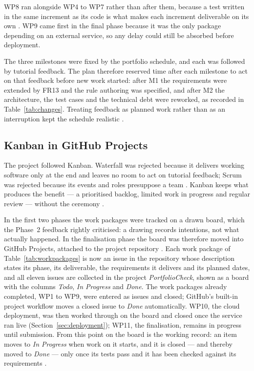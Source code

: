 \documentclass[a4paper,11pt]{article}
\begin{document}
WP8 ran alongside WP4 to WP7 rather than after them, because a test written in
the same increment as its code is what makes each increment deliverable on its
own \citep{Khorikov2020}. WP9 came first in the final phase because it was the
only package depending on an external service, so any delay could still be
absorbed before deployment.

The three milestones were fixed by the portfolio schedule, and each was followed
by tutorial feedback. The plan therefore reserved time after each milestone to
act on that feedback before new work started: after M1 the requirements were
extended by FR13 and the rule authoring was specified, and after M2 the
architecture, the test cases and the technical debt were reworked, as recorded in
Table~\ref{tab:changes}. Treating feedback as planned work rather than as an
interruption kept the schedule realistic \citep{Ambler2022}.

\subsection{Kanban in GitHub Projects}\label{sec:kanban}

The project followed Kanban. Waterfall was rejected because it delivers working
software only at the end and leaves no room to act on tutorial feedback; Scrum
was rejected because its events and roles presuppose a team
\citep{Schwaber2020}. Kanban keeps what produces the benefit --- a prioritised
backlog, limited work in progress and regular review --- without the ceremony
\citep{Ambler2022}.

In the first two phases the work packages were tracked on a drawn board, which
the Phase~2 feedback rightly criticised: a drawing records intentions, not what
actually happened. In the finalisation phase the board was therefore moved into
GitHub Projects, attached to the project repository \citep{GitHubProjects2025}.
Each work package of Table~\ref{tab:workpackages} is now an issue in the
repository whose description states its phase, its deliverable, the requirements
it delivers and its planned dates, and all eleven issues are collected in the
project \textit{PortfolioCheck}, shown as a board with the columns \textit{Todo},
\textit{In Progress} and \textit{Done}. The work packages already completed,
WP1 to WP9, were entered as issues and closed; GitHub's built-in project workflow
moves a closed issue to \textit{Done} automatically. WP10, the cloud
deployment, was then worked through on the board and closed once the service ran
live (Section~\ref{sec:deployment}); WP11, the finalisation, remains in progress
until submission. From this point on the board is the working record: an item moves to \textit{In Progress} when work on it starts, and
it is closed --- and thereby moved to \textit{Done} --- only once its tests pass
and it has been checked against its requirements \citep{Kim2021}.
\end{document}
